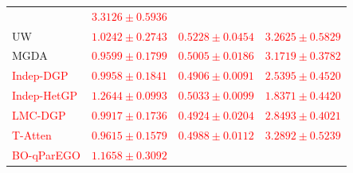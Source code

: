 \documentclass[11pt]{article}
\begin{document}
\begin{table}[!htbp]
\begin{tabular*}{\textwidth}{@{\extracolsep{\fill}}lccc}
		                                                        & \textcolor{red}{$3.3126 \pm 0.5936$}\\%
		UW                                                      & \textcolor{red}{$1.0242 \pm 0.2743$}%
		                                                        & \textcolor{red}{$0.5228 \pm 0.0454$}%
		                                                        & \textcolor{red}{$3.2625 \pm 0.5829$}\\%
		MGDA                                                    & \textcolor{red}{$0.9599 \pm 0.1799$}%
		                                                        & \textcolor{red}{$0.5005 \pm 0.0186$}%
		                                                        & \textcolor{red}{$3.1719 \pm 0.3782$}\\%
		\textcolor{red}{Indep-DGP}%
		                                                        & \textcolor{red}{$0.9958 \pm 0.1841$}%
		                                                        & \textcolor{red}{$\mathbf{0.4906 \pm 0.0091}$}%
		                                                        & \textcolor{red}{$2.5395 \pm 0.4520$}\\%
		\textcolor{red}{Indep-HetGP}%
		                                                        & \textcolor{red}{$1.2644 \pm 0.0993$}%
		                                                        & \textcolor{red}{$0.5033 \pm 0.0099$}%
		                                                        & \textcolor{red}{$\mathbf{1.8371 \pm 0.4420}$}\\%
		\textcolor{red}{LMC-DGP}%
		                                                        & \textcolor{red}{$0.9917 \pm 0.1736$}%
		                                                        & \textcolor{red}{$0.4924 \pm 0.0204$}%
		                                                        & \textcolor{red}{$2.8493 \pm 0.4021$}\\%
		\textcolor{red}{T-Atten}%
		                                                        & \textcolor{red}{$0.9615 \pm 0.1579$}%
		                                                        & \textcolor{red}{$0.4988 \pm 0.0112$}%
		                                                        & \textcolor{red}{$3.2892 \pm 0.5239$}\\%
		\midrule
		\textcolor{red}{BO-qParEGO}%
		                                                        & \textcolor{red}{$1.1658 \pm 0.3092$}%

\end{tabular*}
\end{table}
\end{document}
